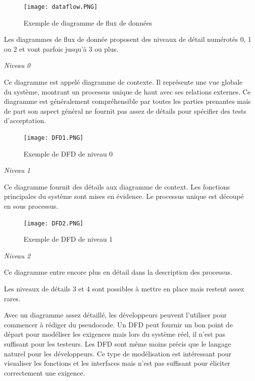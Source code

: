         \begin{figure}[H]
            \centering
            \texttt{[image: dataflow.PNG]}
            \caption{Exemple de diagramme de flux de données}
        \end{figure}
    
         Les diagrammes de flux de donnée proposent des niveaux de détail numérotés 0, 1 ou 2 et vont parfois jusqu'à 3 ou plus.

        \textit{Niveau 0}
    
        Ce diagramme est appelé diagramme de contexte. Il représente une vue globale du système, montrant un processus unique de haut avec ses relations externes. Ce diagramme est généralement compréhensible par toutes les parties prenantes  mais de part son aspect général ne fournit pas assez de détails pour spécifier des tests d'acceptation. 
        \begin{figure}[H]
                \centering
                \texttt{[image: DFD1.PNG]}
                \caption{Exemple de DFD de niveau 0}
            \end{figure}
            
        \textit{Niveau 1}

        Ce diagramme fournit des détails aux diagramme de context. Les fonctions principales du système sont mises en évidence. Le processus unique est découpé en sous processus.
    
        \begin{figure}[H]
            \centering
            \texttt{[image: DFD2.PNG]}
            \caption{Exemple de DFD de niveau 1}
        \end{figure}
        \textit{Niveau 2}
    
         Ce diagramme entre encore plus en détail dans la description des processus. 
    
        Les niveaux de détails 3 et 4 sont possibles à mettre en place mais restent assez rares. 
    
        Avec un diagramme assez détaillé, les développeurs peuvent l'utiliser pour commencer à rédiger du pseudocode. Un DFD peut fournir un bon point de départ pour modéliser les exigences mais lors du système réel, il n'est pas suffisant pour les testeurs. Les DFD sont même moins précis que le langage naturel pour les développeurs. Ce type de modélisation est intéressant pour visualiser les fonctions et les interfaces mais n'est pas suffisant pour éliciter correctement une exigence. \cite{livre4}

